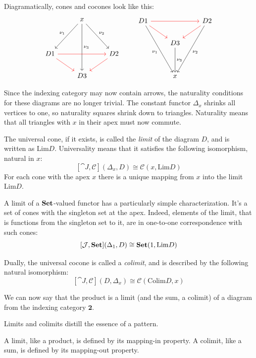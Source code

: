 \documentclass[DaoFP]{subfiles}
\begin{document}
Diagramatically, cones and cocones look like this:
\[
 \begin{tikzcd}
  & x
 \arrow[ddl, "\nu_1"']
 \arrow[ddd, "\nu_3"]
\arrow[ddr, "\nu_2"]
 \\
\\
D 1 
\arrow[rr, red]
\arrow[rd, red]
&& D 2
\arrow[dl, red]
\\
& D 3
 \end{tikzcd}
 \qquad
\begin{tikzcd}
 D 1
 \arrow[rr, red]
 \arrow[dr, red]
 \arrow[dddr, "\nu_1"']
 && D 2
\arrow[dl, red]
 \arrow[dddl, "\nu_2"]
 \\
 & D 3
 \arrow[dd, "\nu_3"]
 \\
 \\
 & x
 \end{tikzcd}
 \]

Since the indexing category may now contain arrows, the naturality conditions for these diagrams are no longer trivial. The constant functor $\Delta_x$ shrinks all vertices to one, so naturality squares shrink down to triangles. Naturality means that all triangles with $x$ in their apex must now commute. 

The universal cone, if it exists, is called the \emph{limit} of the diagram $D$, and is written as $\text{Lim}D$. Universality means that it satisfies the following isomorphism, natural in $x$:
\[ [\cat J, \mathcal{C}](\Delta_x, D)  \cong \mathcal{C}(x, \text{Lim}D) \]
For each cone with the apex $x$ there is a unique mapping from $x$ into the limit $ \text{Lim}D$.

A limit of a $\mathbf{Set}$-valued functor has a particularly simple characterization. It's a set of cones with the singleton set at the apex. Indeed, elements of the limit, that is functions from the singleton set to it, are in one-to-one correspondence with such cones:
\[ [\mathcal{J}, \mathbf{Set}](\Delta_1, D)  \cong \mathbf{Set}(1, \text{Lim}D) \]


Dually, the universal cocone is called a \emph{colimit}, and is described by the following natural isomorphism:
\[ [\cat J, \mathcal{C}](D, \Delta_x)  \cong \mathcal{C}( \text{Colim}D, x) \]


We can now say that the product is a limit (and the sum, a colimit) of a diagram from the indexing category $\mathbf{2}$.

Limits and colimits distill the essence of a pattern. 

A limit, like a product, is defined by its mapping-in property. A colimit, like a sum, is defined by its mapping-out property.
\end{document}

